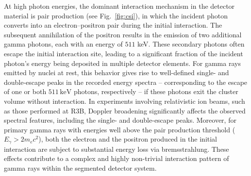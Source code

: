 \documentclass[final,5p,times,twocolumn]{elsarticle}
\begin{document}
At high photon energies, the dominant interaction mechanism in the detector material is pair production (see Fig.~\ref{fig:csi}), in which the incident photon converts into an electron–positron pair during the initial interaction. The subsequent annihilation of the positron results in the emission of two additional gamma photons, each with an energy of $511$ keV. These secondary photons often escape the initial interaction site, leading to a significant fraction of the incident photon’s energy being deposited in multiple detector elements.\newline
For gamma rays emitted by nuclei at rest, this behavior gives rise to well-defined single- and double-escape peaks in the recorded energy spectra -- corresponding to the escape of one or both $511\,\mathrm{keV}$ photons, respectively -- if these photons exit the cluster volume without interaction.\newline
In experiments involving relativistic ion beams, such as those performed at R3B, Doppler broadening significantly affects the observed spectral features, including the single- and double-escape peaks. Moreover, for primary gamma rays with energies well above the pair production threshold ($E_{\gamma} > 2m_{e}c^2$), both the electron and the positron produced in the initial interaction are subject to substantial energy loss via bremsstrahlung. These effects contribute to a complex and highly non-trivial interaction pattern of gamma rays within the segmented detector system.\newline
\end{document}
